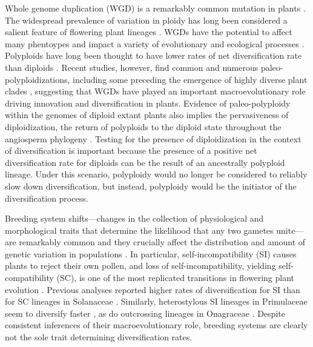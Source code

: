 Whole genome duplication (WGD) is a remarkably common mutation in plants \citep{husband_2013, zenilferguson_2017}.
The widespread prevalence of variation in ploidy has long been considered a salient feature of flowering plant lineages \citep{stebbins1938}. 
WGDs have the potential to affect many phentoypes and impact a variety of evolutionary \citep{ramsey_2002} and ecological processes \citep{sessa_2019}.
Polyploids have long been thought to have lower rates of net diversification rate than diploids \citep{mayrose_2011, mayrose_2015}. 
Recent studies, however, find common and numerous paleo-polyploidizations, including some preceding the emergence of highly diverse plant clades \citep{soltis_2014, landis_2018}, suggesting that WGDs have played an important macroevolutionary role driving innovation and diversification in plants.
Evidence of paleo-polyploidy within the genomes of diploid extant plants also implies the pervasiveness of diploidization, the return of polyploids to the diploid state throughout the angiosperm phylogeny \citep{soltis_2015diploidization, dodsworth_2015}.
Testing for the presence of diploidization in the context of diversification is important because the presence of a positive net diversification rate for diploids can be the result of an ancestrally polyploid lineage.
Under this scenario, polyploidy would no longer be considered to reliably slow down diversification, but instead, polyploidy would be the initiator of the diversification process. %

Breeding system shifts---changes in the collection of physiological and morphological traits that determine the likelihood that any two gametes unite---are remarkably common and they crucially affect the distribution and amount of genetic variation in populations \citep{stebbins1974, barrett2013}.
In particular, self-incompatibility (SI) causes plants to reject their own pollen, and loss of self-incompatibility, yielding self-compatibility (SC), is one of the most replicated transitions in flowering plant evolution \citep{stebbins1974,igic_2008}. %
Previous analyses reported higher rates of diversification for SI than for SC lineages in Solanaceae \citep{goldberg_2010}. 
Similarly, heterostylous SI lineages in Primulaceae seem to diversify faster \citep{devos2014}, as do outcrossing lineages in Onagraceae \citep{freyman_2018}.
Despite consistent inferences of their macroevolutionary role, breeding systems are clearly not the sole trait determining diversification rates.


